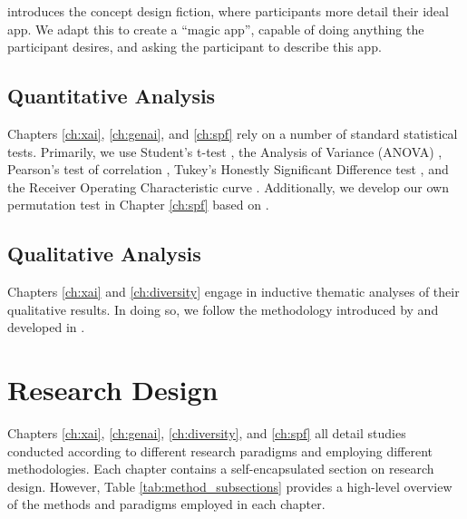 \textcite{blythe2014research} introduces the concept design fiction, where participants more detail their ideal app. We adapt this to create a ``magic app'', capable of doing anything the participant desires, and asking the participant to describe this app.

\subsection{Quantitative Analysis}
Chapters \ref{ch:xai}, \ref{ch:genai}, and \ref{ch:spf} rely on a number of standard statistical tests. Primarily, we use Student's t-test \cite{Mishra_Singh_Pandey_Mishra_Pandey_2019}, the Analysis of Variance (ANOVA) \cite{Mishra_Singh_Pandey_Mishra_Pandey_2019}, Pearson's test of correlation \cite{Schober_Boer_Schwarte_2018}, Tukey's Honestly Significant Difference test \cite{Kim_2015}, and the Receiver Operating Characteristic curve \cite{hanley1989receiver}. Additionally, we develop our own permutation test in Chapter \ref{ch:spf} based on \textcite{good2013permutation}.

\subsection{Qualitative Analysis}
Chapters \ref{ch:xai} and \ref{ch:diversity} engage in inductive thematic analyses of their qualitative results. In doing so, we follow the methodology introduced by \textcite{braun_using_2006} and developed in \textcite{braun_conceptual_2022,braun_toward_2023,noauthor_thematic_nodate}.

\section{Research Design}
Chapters \ref{ch:xai}, \ref{ch:genai}, \ref{ch:diversity}, and \ref{ch:spf} all detail studies conducted according to different research paradigms and employing different methodologies. Each chapter contains a self-encapsulated section on research design. However, Table \ref{tab:method_subsections} provides a high-level overview of the methods and paradigms employed in each chapter.


